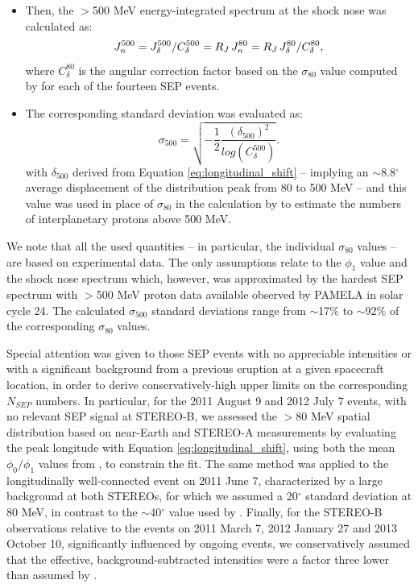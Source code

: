 \documentclass{aastex61}
\begin{document}
\begin{itemize}
\item Then, the $>$500 MeV energy-integrated spectrum at the shock nose was calculated as:
\begin{equation}    
J_{n}^{500} = J_{\delta}^{500} / C_{\delta}^{500} 
= R_{J} \hspace{0.05cm} J_{n}^{80} 
= R_{J} \hspace{0.05cm} J_{\delta}^{80} / C_{\delta}^{80},
\end{equation}
where $C_{\delta}^{80}$ is the angular correction factor based on the $\sigma_{80}$ value computed by \citet{ref:DENOLFO2019} for each of the fourteen SEP events.
\item The corresponding standard deviation was evaluated as:
\begin{equation}
\sigma_{500} = \sqrt{ - \frac{1}{2}\frac{(\delta_{500})^{2}}{log(C_{\delta}^{500})} }.
\end{equation}
with $\delta_{500}$ derived from Equation \ref{eq:longitudinal_shift} -- implying an $\sim$8.8$^{\circ}$ average displacement of the distribution peak from 80 to 500 MeV --
and this value was used in place of $\sigma_{80}$ in the calculation by \citet{ref:DENOLFO2019} to estimate the numbers of interplanetary protons above 500 MeV.
\end{itemize}
We note that all the used quantities -- in particular, the individual $\sigma_{80}$ values -- are based on experimental data. The only assumptions relate to the $\phi_{1}$ value and the shock nose spectrum which, however, was approximated by the hardest SEP spectrum with $>$500 MeV proton data available observed by PAMELA in solar cycle 24. 
The calculated $\sigma_{500}$ standard deviations  
range from $\sim$17\% to $\sim$92\%
of the corresponding $\sigma_{80}$ values.

Special attention was given to those SEP events with no appreciable intensities or with a significant background from a previous eruption at a given spacecraft location, in order to derive conservatively-high upper limits on the corresponding $N_{SEP}$ numbers.
In particular, for the 2011 August 9 and 2012 July 7 events, with no relevant SEP signal at STEREO-B, we assessed the $>$80 MeV spatial distribution based on near-Earth and STEREO-A measurements by evaluating the peak longitude
with Equation \ref{eq:longitudinal_shift}, using both the mean $\phi_{0}/\phi_{1}$ values from \citet{ref:BRUNORICHARDSON2021}, to constrain the fit. The same method was applied to the longitudinally well-connected event on 2011 June 7, characterized by a large background at both STEREOs, for which we  assumed a 20$^{\circ}$ standard deviation at 80 MeV, in contrast to the $\sim$40$^{\circ}$ value used by \citet{ref:DENOLFO2019}.
Finally, for the STEREO-B observations relative to the
events on 2011 March 7, 2012 January 27 and 2013 October 10, significantly influenced by ongoing events, 
we conservatively assumed that the effective, background-subtracted intensities were a factor three lower than assumed by \citet{ref:DENOLFO2019}. 
\end{document}
